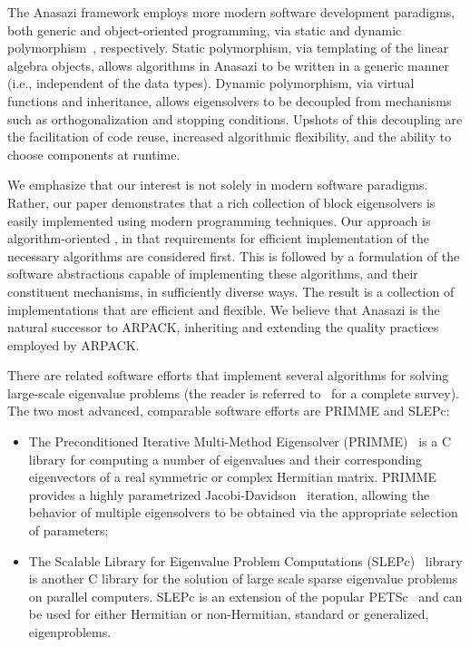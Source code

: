 \documentclass[acmtoms]{acmtrans2m}
\newcounter{algorithm}
\begin{document}
The Anasazi framework employs more modern software development paradigms, both generic and
object-oriented programming, via static and dynamic polymorphism~\cite[Chapter 14]{VJ02}, respectively. 
Static polymorphism, via templating of the linear algebra objects, allows algorithms in Anasazi
to be written in a generic manner (i.e., independent of the data types). Dynamic
polymorphism, via virtual functions and inheritance, allows eigensolvers to be decoupled
from mechanisms such as orthogonalization and stopping conditions. Upshots of this
decoupling are the facilitation of code reuse, increased algorithmic flexibility, and the
ability to choose components at runtime.

We emphasize that our interest is not solely in modern software paradigms. Rather, our
paper demonstrates that a rich collection of block eigensolvers is easily implemented
using modern programming techniques. Our approach is algorithm-oriented \cite{muov:94}, in
that requirements for efficient implementation of the necessary algorithms are considered
first. This is followed by a formulation of the software abstractions capable of
implementing these algorithms, and their constituent mechanisms, in sufficiently diverse
ways. The result is a collection of implementations that are efficient and flexible. We
believe that Anasazi is the natural successor to ARPACK, inheriting and extending the
quality practices employed by ARPACK.

There are related software efforts that implement several algorithms for solving
large-scale eigenvalue problems (the reader is referred to~\cite{slepc:05}
for a complete survey). The two most advanced, comparable software efforts are PRIMME and
SLEPc:
\begin{itemize}
\item
The Preconditioned Iterative Multi-Method Eigensolver (PRIMME)~\cite{primme:06} is a C
library for computing a number of eigenvalues and their corresponding eigenvectors of a real
symmetric or complex Hermitian matrix. PRIMME provides a highly parametrized
Jacobi-Davidson~\cite{slvo:96} iteration, allowing the behavior of multiple eigensolvers
to be obtained via the appropriate selection of parameters;
\item
The Scalable Library for Eigenvalue Problem Computations (SLEPc)~\cite{slepc:06} library
is another C library for the solution of large scale sparse eigenvalue problems on parallel
computers. SLEPc is an extension of the popular PETSc~\cite{petsc-web-page} and can be
used for either Hermitian or non-Hermitian, standard or generalized, eigenproblems.
\end{itemize}
\end{document}
